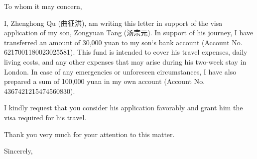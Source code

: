 \documentclass{letter}
\date{March 02, 2024}
\begin{document}
\begin{letter}{}

\opening{To whom it may concern,}

I, Zhenghong Qu (曲征洪), am writing this letter in support of the visa application of my son, Zongyuan Tang (汤宗元). In support of his journey, I have transferred an amount of 30,000 yuan to my son`s bank account (Account No. 6217001180023025581). This fund is intended to cover his travel expenses, daily living costs, and any other expenses that may arise during his two-week stay in London. In case of any emergencies or unforeseen circumstances, I have also prepared a sum of 100,000 yuan in my own account (Account No. 4367421215474560830).

I kindly request that you consider his application favorably and grant him the visa required for his travel.

Thank you very much for your attention to this matter.



\closing{Sincerely,\\
\\
}

    
    
    
\end{letter}
\end{document}
